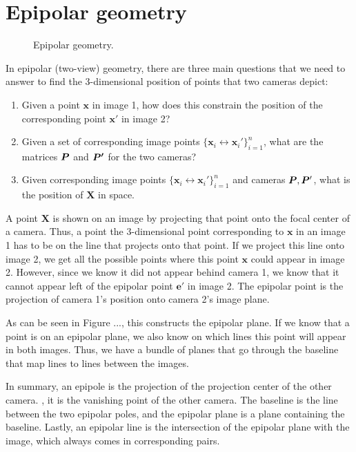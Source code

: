 \section{Epipolar geometry}

\begin{figure}[h!]
    \centering
    \caption{Epipolar geometry.}
    \label{fig:epipolar-geometry}
\end{figure}

In epipolar (two-view) geometry, there are three main questions that we need
to answer to find the 3-dimensional position of points that two cameras
depict:
\begin{enumerate}
  \item Given a point $\bm{x}$ in image 1, how does this constrain the
    position of the corresponding point $\bm{x}'$ in image 2?
  \item Given a set of corresponding image points $\{ \bm{x}_i
    \leftrightarrow \bm{x}_i' \}_{i=1}^n$, what are the matrices $\bm{P}$ and
    $\bm{P'}$ for the two cameras?
  \item Given corresponding image points $\{ \bm{x}_i \leftrightarrow
    \bm{x}_i' \}_{i=1}^n$ and cameras $\bm{P},\bm{P}'$, what is the position
    of $\bm{X}$ in space.
\end{enumerate}

A point $\bm{X}$ is shown on an image by projecting that point onto the focal
center of a camera. Thus, a point the 3-dimensional point corresponding to
$\bm{x}$ in an image 1 has to be on the line that projects onto that point.
If we project this line onto image 2, we get all the possible points where
this point $\bm{x}$ could appear in image 2. However, since we know it did
not appear behind camera 1, we know that it cannot appear left of the
epipolar point $\bm{e}'$ in image 2. The epipolar point is the projection of
camera 1's position onto camera 2's image plane.

As can be seen in Figure ..., this constructs the epipolar plane. If we know
that a point is on an epipolar plane, we also know on which lines this point
will appear in both images. Thus, we have a bundle of planes that go through
the baseline that map lines to lines between the images.

In summary, an epipole is the projection of the projection center of the
other camera. \Ie, it is the vanishing point of the other camera. The
baseline is the line between the two epipolar poles, and the epipolar plane
is a plane containing the baseline. Lastly, an epipolar line is the
intersection of the epipolar plane with the image, which always comes in
corresponding pairs.

